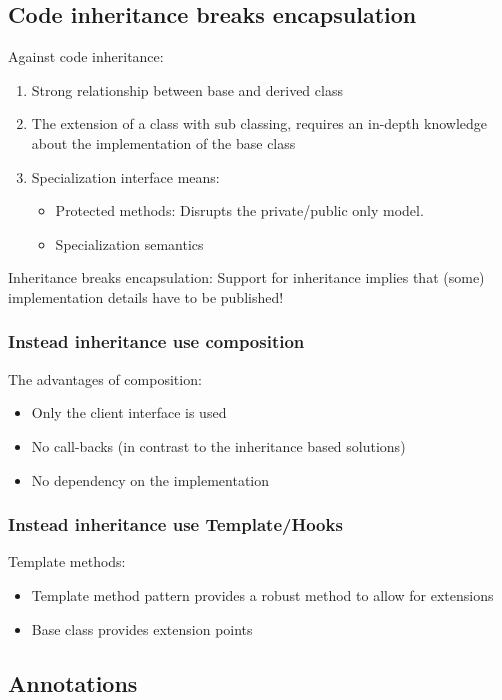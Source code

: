 \documentclass[10pt]{article}
\begin{document}
\subsection{Code inheritance breaks encapsulation}
Against code inheritance:
\begin{enumerate}
	\item Strong relationship between base and derived class
	\item The extension of a class with sub classing, requires an in-depth knowledge about the implementation of the base class
	\item Specialization interface means:
		\begin{itemize}
			\item Protected methods: Disrupts the private/public only model.
			\item Specialization semantics
		\end{itemize}
\end{enumerate}
Inheritance breaks encapsulation: Support for inheritance implies that (some) implementation details have to be published!
\subsubsection{Instead inheritance use composition}
The advantages of composition:
\begin{itemize}
	\item Only the client interface is used
	\item No call-backs (in contrast to the inheritance based solutions)
	\item No dependency on the implementation
\end{itemize}
\subsubsection{Instead inheritance use Template/Hooks}
Template methods:
\begin{itemize}
	\item Template method pattern provides a robust method to allow for extensions
	\item Base class provides extension points
\end{itemize}
\subsection{Annotations}
\end{document}
